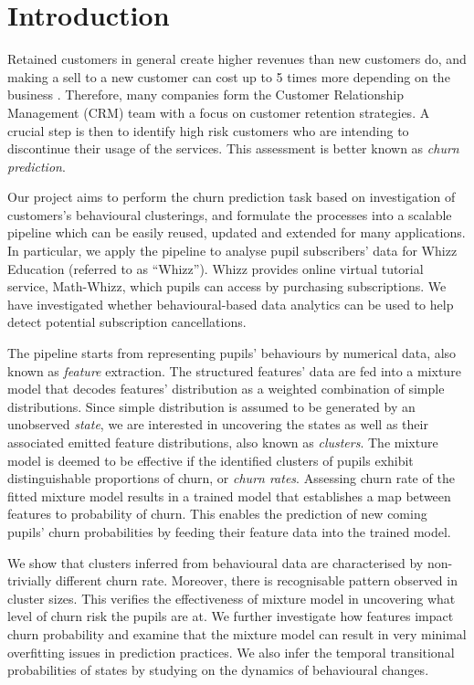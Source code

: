 \section{Introduction}
\label{sec:intro}

Retained customers in general create higher revenues than new customers do, and making a sell to a new customer can cost up to 5 times more depending on the business \cite{Slater2000}. Therefore, many companies form the Customer Relationship Management (CRM) team with a focus on customer retention strategies. A crucial step is then to identify high risk customers who are intending to discontinue their usage of the services. This assessment is better known as \textit{churn prediction}.

Our project aims to perform the churn prediction task based on investigation of customers's behavioural clusterings, and formulate the processes into a scalable pipeline which can be easily reused, updated and extended for many applications. In particular, we apply the pipeline to analyse pupil subscribers' data for Whizz Education (referred to as ``Whizz''). Whizz provides online virtual tutorial service, Math-Whizz, which pupils can access by purchasing subscriptions. We have investigated whether behavioural-based data analytics can be used to help detect potential subscription cancellations.

The pipeline starts from representing pupils' behaviours by numerical data, also known as \textit{feature} extraction. The structured features' data are fed into a mixture model that decodes features' distribution as a weighted combination of simple distributions. Since simple distribution is assumed to be generated by an unobserved \textit{state}, we are interested in uncovering the states as well as their associated emitted feature distributions, also known as \textit{clusters}. The mixture model is deemed to be effective if the identified clusters of pupils exhibit distinguishable proportions of churn, or \textit{churn rates}. Assessing churn rate of the fitted mixture model results in a trained model that establishes a map between features to probability of churn. This enables the prediction of new coming pupils' churn probabilities by feeding their feature data into the trained model.

We show that clusters inferred from behavioural data are characterised by non-trivially different churn rate. Moreover, there is recognisable pattern observed in cluster sizes. This verifies the effectiveness of mixture model in uncovering what level of churn risk the pupils are at. We further investigate how features impact churn probability and examine that the mixture model can result in very minimal overfitting issues in prediction practices. We also infer the temporal transitional probabilities of states by studying on the dynamics of behavioural changes.

